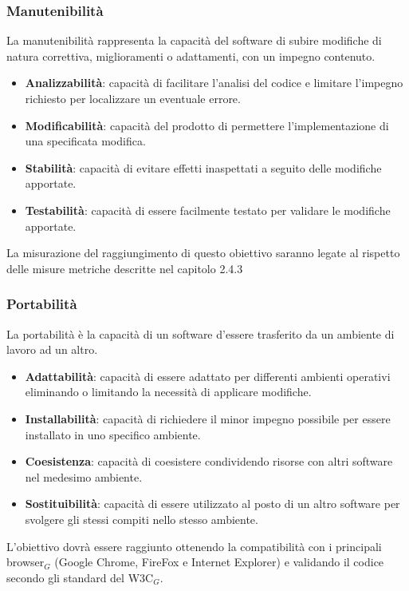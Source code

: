 \subsubsection{Manutenibilità}
La manutenibilità rappresenta la capacità del software di subire modifiche di natura correttiva, miglioramenti o adattamenti, con un impegno contenuto.
\begin{itemize}
	\item \textbf{Analizzabilità}: capacità di facilitare l'analisi del codice e limitare l'impegno richiesto per localizzare un eventuale errore.
	\item \textbf{Modificabilità}: capacità del prodotto di permettere l'implementazione di una specificata modifica.
	\item \textbf{Stabilità}: capacità di evitare effetti inaspettati a seguito delle modifiche apportate.
	\item \textbf{Testabilità}: capacità di essere facilmente testato per validare le modifiche apportate.
\end{itemize}
La misurazione del raggiungimento di questo obiettivo saranno legate al rispetto
delle misure metriche descritte nel capitolo 2.4.3
\subsubsection{Portabilità}
La portabilità è la capacità di un software d'essere trasferito da un ambiente di
lavoro ad un altro.
\begin{itemize}
	\item \textbf{Adattabilità}: capacità di essere adattato per differenti ambienti operativi eliminando o limitando la necessità di applicare modifiche.
	\item \textbf{Installabilità}: capacità di richiedere il minor impegno possibile per essere installato in uno specifico ambiente.
	\item \textbf{Coesistenza}: capacità di coesistere condividendo risorse con altri software nel medesimo ambiente.
	\item \textbf{Sostituibilità}: capacità di essere utilizzato al posto di un altro software per svolgere gli stessi compiti nello stesso ambiente.
\end{itemize}
L'obiettivo dovrà essere raggiunto ottenendo la compatibilità con i principali browser$_G$ (Google Chrome, FireFox e Internet Explorer) e validando il codice secondo gli standard del W3C$_G$.
